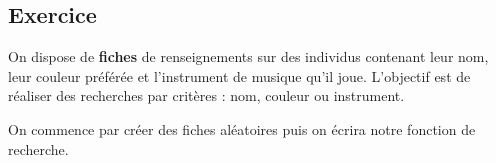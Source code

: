 \documentclass[11pt,a4paper]{article}
\newcounter{numexo}
\begin{document}

\addtocounter{numexo}{1}
\subsection*{\Large Exercice \thenumexo }

On dispose de \textbf{fiches} de renseignements sur des individus contenant leur nom, leur couleur préférée et l'instrument de musique qu'il joue. L'objectif est de réaliser des recherches par critères : nom, couleur ou instrument.

On commence par créer des fiches aléatoires puis on écrira notre fonction de recherche.
\end{document}
